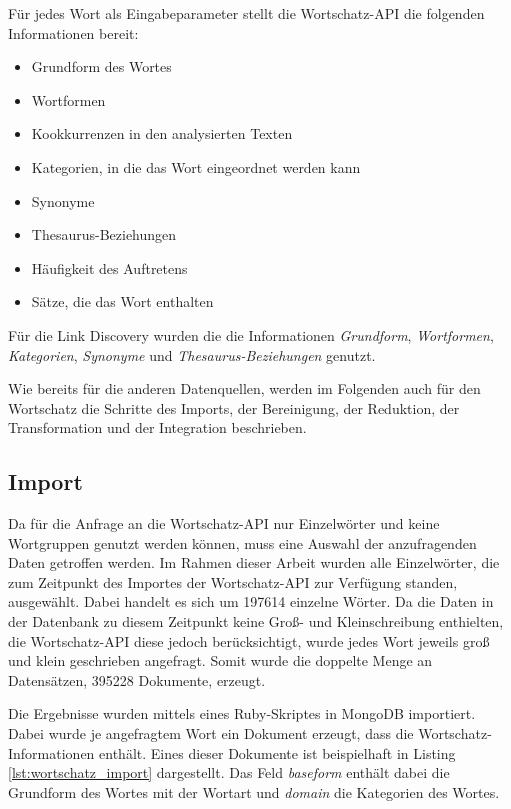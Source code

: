 Für jedes Wort als Eingabeparameter stellt die Wortschatz-API die folgenden Informationen bereit:

\begin{itemize}
    \item Grundform des Wortes
    \item Wortformen
    \item Kookkurrenzen in den analysierten Texten
    \item Kategorien, in die das Wort eingeordnet werden kann
    \item Synonyme
    \item Thesaurus-Beziehungen
    \item Häufigkeit des Auftretens
    \item Sätze, die das Wort enthalten
\end{itemize}

Für die Link Discovery wurden die die Informationen \emph{Grundform}, \emph{Wortformen}, \emph{Kategorien}, \emph{Synonyme} und \emph{Thesaurus-Beziehungen} genutzt.

Wie bereits für die anderen Datenquellen, werden im Folgenden auch für den Wortschatz die Schritte des Imports, der Bereinigung, der Reduktion, der Transformation und der Integration beschrieben.

\subsection{Import}

Da für die Anfrage an die Wortschatz-API nur Einzelwörter und keine Wortgruppen genutzt werden können, muss eine Auswahl der anzufragenden Daten getroffen werden. Im Rahmen dieser Arbeit wurden alle Einzelwörter, die zum Zeitpunkt des Importes der Wortschatz-API zur Verfügung standen, ausgewählt. Dabei handelt es sich um \num{197614} einzelne Wörter. Da die Daten in der Datenbank zu diesem Zeitpunkt keine Groß- und Kleinschreibung enthielten, die Wortschatz-API diese jedoch berücksichtigt, wurde jedes Wort jeweils groß und klein geschrieben angefragt. Somit wurde die doppelte Menge an Datensätzen, \num{395228} Dokumente, erzeugt.

Die Ergebnisse wurden mittels eines Ruby-Skriptes in MongoDB importiert. Dabei wurde je angefragtem Wort ein Dokument erzeugt, dass die Wortschatz-Informationen enthält. Eines dieser Dokumente ist beispielhaft in Listing \ref{lst:wortschatz_import} dargestellt. Das Feld \emph{baseform} enthält dabei die Grundform des Wortes mit der Wortart und \emph{domain} die Kategorien des Wortes.

